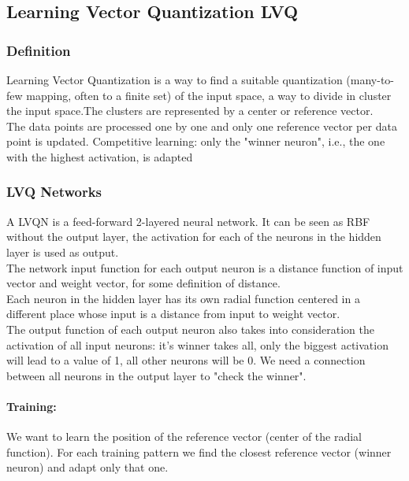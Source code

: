 \subsection{Learning Vector Quantization LVQ}

\subsubsection{Definition}
Learning Vector Quantization is a way to find a suitable quantization (many-to-few mapping, often to a finite set) of the input space, a way to divide in cluster the input space.The clusters are represented by a center or reference vector.\\

The data points are processed one by one and only one reference vector per data point is updated. Competitive learning: only the "winner neuron", i.e., the one with the highest activation, is adapted

\subsubsection{LVQ Networks}
A LVQN is a feed-forward 2-layered neural network. It can be seen as RBF without the output layer, the activation for each of the neurons in the hidden layer is used as output.\\

The network input function for each output neuron is a distance function of input vector and weight vector, for some definition of distance.\\
Each neuron in the hidden layer has its own radial function centered in a different place whose input is a distance from input to weight vector.\\

The output function of each output neuron also takes into consideration the activation of all input neurons: it's winner takes all, only the biggest activation will lead to a value of 1, all other neurons will be 0. We need a connection between all neurons in the output layer to "check the winner".\\

\paragraph{Training:} We want to learn the position of the reference vector (center of the radial function). For each training pattern we find the closest reference vector (winner neuron) and adapt only that one. \\

